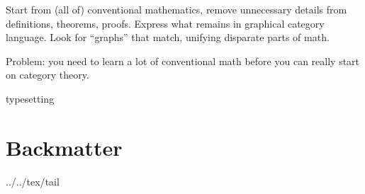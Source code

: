 \documentclass[11pt]{book}
\def \texFolder {../../tex/}
\begin{document}
Start from (all of) conventional mathematics,
remove unnecessary details from definitions, theorems, proofs.
Express what remains in graphical category language.
Look for ``graphs'' that match, unifying disparate parts of math.

Problem: you need to learn a lot of conventional math before
you can really start on category theory.

 
\pagebreak
\appendix
{typesetting}

\backmatter
\part{Backmatter}
{\texFolder}{tail}

\end{document}
